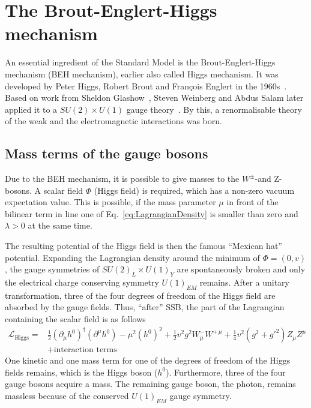 \section{The Brout-Englert-Higgs mechanism}
\label{sec:HiggsMechanism}
An essential ingredient of the Standard Model is the Brout-Englert-Higgs mechanism (BEH mechanism), earlier also called Higgs mechanism.
It was developed by Peter Higgs, Robert Brout and Fran\c{c}ois Englert in the 1960s~\cite{bib:HiggsMechanism_Brout_Englert,bib:Higgs_Prediction,bib:Higgs_Prediction_2,bib:HiggsMechanism_Guralnik_Hagen_Kibble,bib:HiggsMechanism_Higgs_1966,bib:HiggsMechanism_Kibble_1967}. Based on work from Sheldon Glashow~\cite{bib:HiggsMechanism_Glashow_1961}, Steven Weinberg and Abdus Salam later applied it to a $SU(2) \times U(1)$ gauge theory~\cite{bib:HiggsMechanism_Weinberg_1967,bib:HiggsMechanism_Salam_1968}.
By this, a renormalisable theory of the weak and the electromagnetic interactions was born.

\subsection*{Mass terms of the gauge bosons}
Due to the BEH mechanism, it is possible to give masses to the $W^{\pm}$-and Z-bosons.
A scalar field $\Phi$ (Higgs field) is required, which has a non-zero vacuum expectation value.
This is possible, if the mass parameter $\mu$ in front of the bilinear term in line one of Eq.~\eqref{eq:LagrangianDensity} is smaller than zero and $\lambda>0$ at the same time.

The resulting potential of the Higgs field is then the famous ``Mexican hat'' potential.
Expanding the Lagrangian density around the minimum of $\Phi = \left( 0,v \right)$, the gauge symmetries of $SU(2)_L \times U(1)_Y$ are spontaneously broken and only the electrical charge conserving symmetry $U(1)_{EM}$ remains.
After a unitary transformation, three of the four degrees of freedom of the Higgs field are absorbed by the gauge fields.
Thus, ``after'' SSB, the part of the Lagrangian containing the scalar field is as follows
\begin{equation}
\begin{split}
\mathcal{L}_{\text{Higgs}} =& \frac{1}{2} \left( \partial_{\mu} h^0 \right)^{\dagger} \left( \partial^{\mu} h^0 \right) - \mu^2 \left(h^0\right)^2 + \frac{1}{2} v^2 g^2 W_{\mu}^- W^{+\,\mu}
                    + \frac{1}{4} v^2 \left(g^2 + g'^2  \right)  Z_{\mu} Z^{\mu}\\
  &+ \text{interaction terms}
\end{split}
\label{eq:LHiggs}
\end{equation}
One kinetic and one mass term for one of the degrees of freedom of the Higgs fields remains, which is the Higgs boson ($h^0$).
Furthermore, three of the four gauge bosons acquire a mass.
The remaining gauge boson, the photon, remains massless because of the conserved $U(1)_{EM}$ gauge symmetry.

